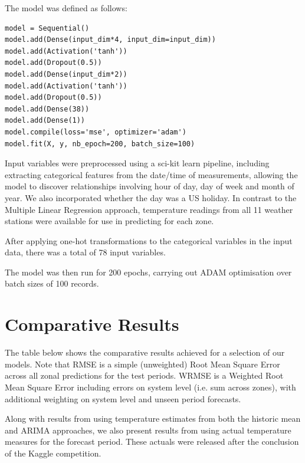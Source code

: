 \documentclass{article} %
\begin{document}
The model was defined as follows:

\begin{verbatim}
model = Sequential()
model.add(Dense(input_dim*4, input_dim=input_dim))
model.add(Activation('tanh'))
model.add(Dropout(0.5))
model.add(Dense(input_dim*2))
model.add(Activation('tanh'))
model.add(Dropout(0.5))
model.add(Dense(38))
model.add(Dense(1))
model.compile(loss='mse', optimizer='adam')
model.fit(X, y, nb_epoch=200, batch_size=100)
\end{verbatim}

Input variables were preprocessed using a sci-kit learn pipeline, including extracting categorical features from the date/time of measurements, allowing the model to discover relationships involving hour of day, day of week and month of year.  We also incorporated whether the day was a US holiday.  In contrast to the Multiple Linear Regression approach, temperature readings from all 11 weather stations were available for use in predicting for each zone.

After applying one-hot transformations to the categorical variables in the input data, there was a total of 78 input variables.

The model was then run for 200 epochs, carrying out ADAM optimisation over batch sizes of 100 records.

\section*{Comparative Results}
The table below shows the comparative results achieved for a selection of our models.  Note that RMSE is a simple (unweighted) Root Mean Square Error across all zonal predictions for the test periods.  WRMSE is a Weighted Root Mean Square Error including errors on system level (i.e. sum across zones), with additional weighting on system level and unseen period forecasts.

Along with results from using temperature estimates from both the historic mean and ARIMA approaches, we also present results from using actual temperature measures for the forecast period.  These actuals were released after the conclusion of the Kaggle competition.
\end{document}
